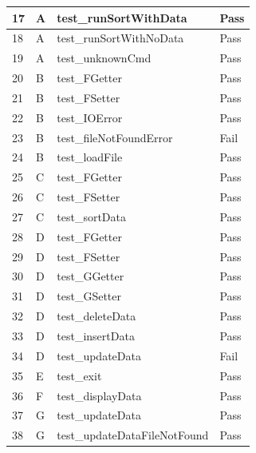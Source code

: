 \documentclass[12pt, letterpaper, titlepage]{article}
\begin{document}
\begin{table}[H]
\begin{tabular}{|l|l|l|l|}
    17               & A               & test\_runSortWithData         & Pass             \\ \hline
    18               & A               & test\_runSortWithNoData       & Pass             \\ \hline
    19               & A               & test\_unknownCmd              & Pass             \\ \hline
    20               & B               & test\_FGetter                 & Pass             \\ \hline
    21               & B               & test\_FSetter                 & Pass             \\ \hline
    22               & B               & test\_IOError                 & Pass             \\ \hline
    \rowcolor[HTML]{FF7F7F} 
    23               & B               & test\_fileNotFoundError       & Fail             \\ \hline
    24               & B               & test\_loadFile                & Pass             \\ \hline
    25               & C               & test\_FGetter                 & Pass             \\ \hline
    26               & C               & test\_FSetter                 & Pass             \\ \hline
    27               & C               & test\_sortData                & Pass             \\ \hline
    28               & D               & test\_FGetter                 & Pass             \\ \hline
    29               & D               & test\_FSetter                 & Pass             \\ \hline
    30               & D               & test\_GGetter                 & Pass             \\ \hline
    31               & D               & test\_GSetter                 & Pass             \\ \hline
    32               & D               & test\_deleteData              & Pass             \\ \hline
    33               & D               & test\_insertData              & Pass             \\ \hline
    \rowcolor[HTML]{FF7F7F} 
    34               & D               & test\_updateData              & Fail             \\ \hline
    35               & E               & test\_exit                    & Pass             \\ \hline
    36               & F               & test\_displayData             & Pass             \\ \hline
    37               & G               & test\_updateData              & Pass             \\ \hline
    38               & G               & test\_updateDataFileNotFound  & Pass             \\ \hline
    \end{tabular}
    \end{table}
\end{document}
